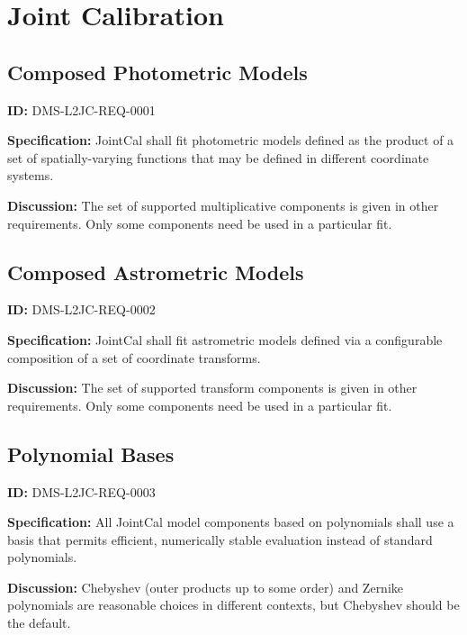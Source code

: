 \documentclass[SE,toc,lsstdraft]{lsstdoc}
\date{2017-11-21}
\begin{document}
\maketitle

\section{Joint Calibration}

\subsection{Composed Photometric Models}

\label{DMS-L2JC-REQ-0001}
\textbf{ID:} DMS-L2JC-REQ-0001

\textbf{Specification:}
JointCal shall fit photometric models defined as the product of a set of spatially-varying functions that may be defined in different coordinate systems.

\textbf{Discussion:}
The set of supported multiplicative components is given in other requirements.  Only some components need be used in a particular fit.

\subsection{Composed Astrometric Models}

\label{DMS-L2JC-REQ-0002}
\textbf{ID:} DMS-L2JC-REQ-0002

\textbf{Specification:}
JointCal shall fit astrometric models defined via a configurable composition of a set of coordinate transforms.

\textbf{Discussion:}
The set of supported transform components is given in other requirements.  Only some components need be used in a particular fit.

\subsection{Polynomial Bases}

\label{DMS-L2JC-REQ-0003}
\textbf{ID:} DMS-L2JC-REQ-0003

\textbf{Specification:}
All JointCal model components based on polynomials shall use a basis that permits efficient, numerically stable evaluation instead of standard polynomials.

\textbf{Discussion:}
Chebyshev (outer products up to some order) and Zernike polynomials are reasonable choices in different contexts, but Chebyshev should be the default.
\end{document}
